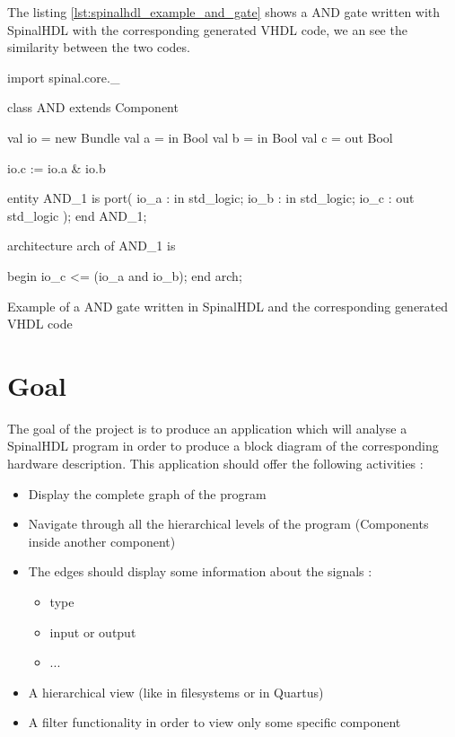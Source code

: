 The listing \ref{lst:spinalhdl_example_and_gate} shows a AND gate written with
SpinalHDL with the corresponding generated VHDL code, we an see the
similarity between the two codes.

\begin{listing}[H] %
    \centering

    \begin{minipage}[c]{0.45\textwidth}
    \begin{scalacode}
    import spinal.core._

    class AND extends Component
    {
        val io = new Bundle
        {
            val a = in Bool
            val b = in Bool
            val c = out Bool
        }

        io.c := io.a & io.b
    }
    \end{scalacode}
    \end{minipage}
    \hfill
    \begin{minipage}[c]{0.45\textwidth}
    \begin{vhdlcode}
    entity AND_1 is
        port(
            io_a : in std_logic;
            io_b : in std_logic;
            io_c : out std_logic
        );
    end AND_1;

    architecture arch of AND_1 is

    begin
      io_c <= (io_a and io_b);
    end arch;
    \end{vhdlcode}
    \end{minipage}
    \caption{Example of a AND gate written in SpinalHDL and the corresponding
             generated VHDL code}
    \label{lst:spinalhdl_example_and_gate}
\end{listing}

\section{Goal}
\label{sec:Goal}

The goal of the project is to produce an application which will analyse a
SpinalHDL program in order to produce a block diagram of the corresponding
hardware description. This application should offer the following activities :

\begin{itemize}
    \item Display the complete graph of the program
    \item Navigate through all the hierarchical levels of the program (Components
      inside another component)
    \item The edges should display some information about the signals :
    \begin{itemize}
        \item type
        \item input or output
        \item ...
    \end{itemize}
    \item A hierarchical view (like in filesystems or in Quartus)
    \item A filter functionality in order to view only some specific component
\end{itemize}

